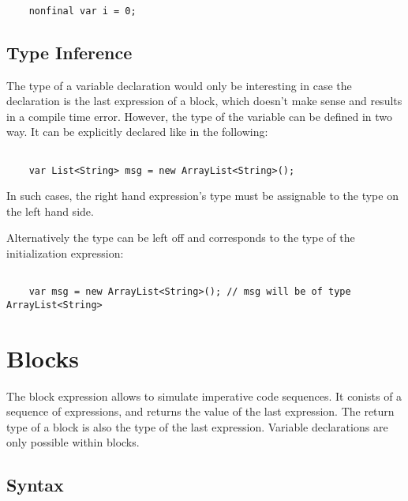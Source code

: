 \documentclass[a4paper,10pt]{scrreprt}
\begin{document}
\begin{lstlisting}

	nonfinal var i = 0;

\end{lstlisting}





\subsection{ Type Inference }

The type of a variable declaration would only be interesting in case the declaration is the last expression of a block, which doesn't make sense and results in a compile time error.
However, the type of the variable can be defined in two way. It can be explicitly declared like in the following:

\begin{lstlisting}

	var List<String> msg = new ArrayList<String>(); 

\end{lstlisting}

In such cases, the right hand expression's type must be assignable to the type on the left hand side. 

Alternatively the type can be left off and corresponds to the type of the initialization expression:  

\begin{lstlisting}

	var msg = new ArrayList<String>(); // msg will be of type ArrayList<String>  

\end{lstlisting}







\section{Blocks}
\label{Blocks}

The block expression allows to simulate imperative code sequences. It conists of a sequence of expressions, and returns the value of the last expression.
The return type of a block is also the type of the last expression. 
Variable declarations are only possible within blocks.

\subsection{ Syntax }
\end{document}
